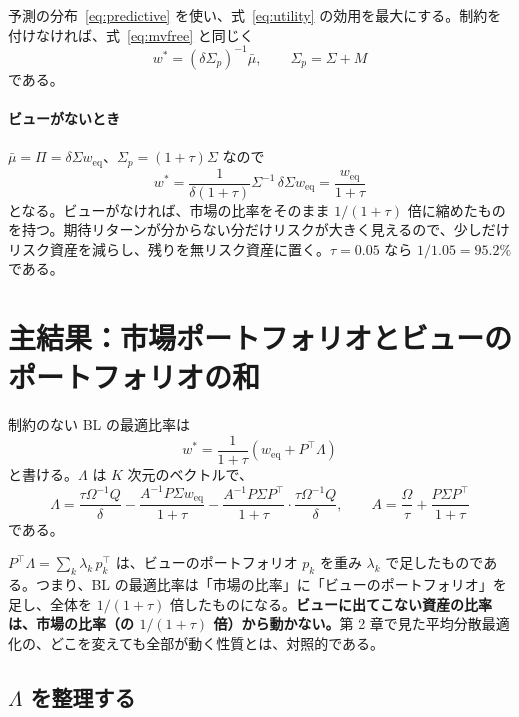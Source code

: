\documentclass[xelatex,ja=standard,jafont=hiragino-pron,a4paper,11pt,openany]{bxjsreport}
\newcommand{\T}{^{\top}}
\newcommand{\weq}{w_{\mathrm{eq}}}
\newcommand{\mub}{\bar{\mu}}
\newcommand{\Sp}{\Sigma_{p}}
\begin{document}
予測の分布~\eqref{eq:predictive} を使い、式~\eqref{eq:utility} の効用を最大にする。制約を付けなければ、式~\eqref{eq:mvfree} と同じく
\begin{equation}
w^* = (\delta\Sp)^{-1}\mub,\qquad \Sp = \Sigma + M
\label{eq:wstar}
\end{equation}
である。

\paragraph{ビューがないとき}
$\mub = \Pi = \delta\Sigma\weq$、$\Sp = (1 + \tau)\Sigma$ なので
\begin{equation}
w^* = \frac{1}{\delta(1 + \tau)}\Sigma^{-1}\,\delta\Sigma\weq = \frac{\weq}{1 + \tau}
\end{equation}
となる。ビューがなければ、市場の比率をそのまま $1/(1 + \tau)$ 倍に縮めたものを持つ。期待リターンが分からない分だけリスクが大きく見えるので、少しだけリスク資産を減らし、残りを無リスク資産に置く。$\tau = 0.05$ なら $1/1.05 = 95.2\%$ である。

\section{主結果：市場ポートフォリオとビューのポートフォリオの和}

\begin{thmbox}
制約のない BL の最適比率は
\begin{equation}
w^* = \frac{1}{1 + \tau}\left(\weq + P\T\Lambda\right)
\label{eq:hl}
\end{equation}
と書ける。$\Lambda$ は $K$ 次元のベクトルで、
\begin{equation}
\Lambda = \frac{\tau\Omega^{-1}Q}{\delta} - \frac{A^{-1}P\Sigma\weq}{1 + \tau} - \frac{A^{-1}P\Sigma P\T}{1 + \tau}\cdot\frac{\tau\Omega^{-1}Q}{\delta},\qquad
A = \frac{\Omega}{\tau} + \frac{P\Sigma P\T}{1 + \tau}
\label{eq:lambda}
\end{equation}
である。
\end{thmbox}

$P\T\Lambda = \sum_k \lambda_k\,p_k\T$ は、ビューのポートフォリオ $p_k$ を重み $\lambda_k$ で足したものである。つまり、BL の最適比率は「市場の比率」に「ビューのポートフォリオ」を足し、全体を $1/(1+\tau)$ 倍したものになる。\textbf{ビューに出てこない資産の比率は、市場の比率（の $1/(1+\tau)$ 倍）から動かない。}第 2 章で見た平均分散最適化の、どこを変えても全部が動く性質とは、対照的である。

\subsection{$\Lambda$ を整理する}
\end{document}
